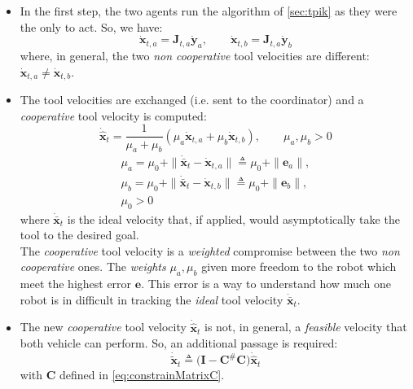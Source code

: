 \begin{itemize}
	\item In the first step, the two agents run the algorithm of \ref{sec:tpik} as they were the only to act. So, we have:
	\begin{equation}
		\boldsymbol{\dot{x}}_{t,a} = \boldsymbol{J}_{t,a} \boldsymbol{\dot{y}}_{a} , \qquad 
		\boldsymbol{\dot{x}}_{t,b} = \boldsymbol{J}_{t,a} \boldsymbol{\dot{y}}_{b}	
	\end{equation}
	where, in general, the two \textit{non cooperative} tool velocities are different: $\boldsymbol{\dot{x}}_{t,a} \neq \boldsymbol{\dot{x}}_{t,b}$.
	
	\item The tool velocities are exchanged (i.e. sent to the coordinator) and a \textit{cooperative} tool velocity is computed:
	\begin{equation}\label{eq:weightsum}
		\dot{\hat{\boldsymbol{x}}}_t = \dfrac{1}{\mu_a + \mu_b} (\mu_a \dot{\boldsymbol{x}}_{t,a}  + \mu_b \dot{\boldsymbol{x}}_{t,b}), \qquad
		\mu_a , \mu_b > 0	
	\end{equation}
    \begin{equation}
		\begin{gathered}
			\mu_a = \mu_0 + \| \dot{\bar{\boldsymbol{x}}}_t - \dot{\boldsymbol{x}}_{t,a} \| \triangleq \mu_0 + \| \boldsymbol{e}_a \|, \\
			\mu_b = \mu_0 + \| \dot{\bar{\boldsymbol{x}}}_t - \dot{\boldsymbol{x}}_{t,b} \| \triangleq \mu_0 + \| \boldsymbol{e}_b \|, \\
			\mu_0 > 0
	    \end{gathered}
	\end{equation}
	where $\boldsymbol{\dot{\bar{x}}}_t$ is the ideal velocity that, if applied, would asymptotically take the tool to the desired goal.\\
	The \textit{cooperative} tool velocity is a \textit{weighted} compromise between the two \textit{non cooperative} ones. The \textit{weights} $\mu_a, \mu_b$ given more freedom to the robot which meet the highest error $\boldsymbol{e}$. This error is a way to understand how much one robot is in difficult in tracking the \textit{ideal} tool velocity $\boldsymbol{\dot{\bar{x}}}_t$.
	
	\item The new \textit{cooperative} tool velocity $\dot{\hat{\boldsymbol{x}}}_t$ is not, in general, a \textit{feasible} velocity that both vehicle can perform. So, an additional passage is required:
	\begin{equation}
		\dot{\tilde{\boldsymbol{x}}}_t \triangleq \big( \boldsymbol{I} - \boldsymbol{C}^\# \boldsymbol{C} \big) \dot{\hat{\boldsymbol{x}}}_t
	\end{equation}
	with $\boldsymbol{C}$ defined in \eqref{eq:constrainMatrixC}.
	

\end{itemize}
